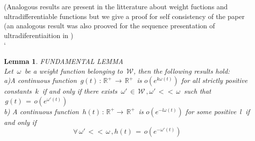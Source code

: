 \documentclass[12pt,a4paper]{amsart}
\newcommand{\RR}{\mathbb R}
\newtheorem{lemma}[theorem]{Lemma}
\begin{document}
(Analogous results are present in the litterature about weight fuctions and ultradifferentiable functions but we give a proof for self consistency of the paper (an analogous result was also prooved for the sequence presentation of ultradiferentiaition in 
\cite{D.V.V.} )
\\
`
\begin{lemma}

  FUNDAMENTAL LEMMA
  \\
  
Let $\,\omega\,$ be a weight function belonging to
  $\,\mathcal{W} $, then the following results hold:
  \\
  
a)A continuous function
 $\,g(t)\,:\,\RR^+\,\rightarrow\,\RR^+\,$ is
  $o(e^{k\omega(t)})$ for all strictly positive constants $ \,k\,$ if and only if there exists
 $\,\omega'\,\in\,\mathcal{W}\,,\omega'\,<<\,\omega\,$ 
  such that $\,g(t)\,=\,o(e^{\omega'(t)})$
\\  
  b) A continuous function 
   $\,h(t)\,:\,\RR^+\rightarrow\,\RR^+\,$ is 
$o(e^{-l\omega(t)})$ for some positive $\,l\,$ if and only if 
$$\,\forall\,\omega'\,<<\,\omega\,,
 h(t)\,=\,o(e^{-\omega'(t)})\,$$

\end{lemma}
\end{document}
